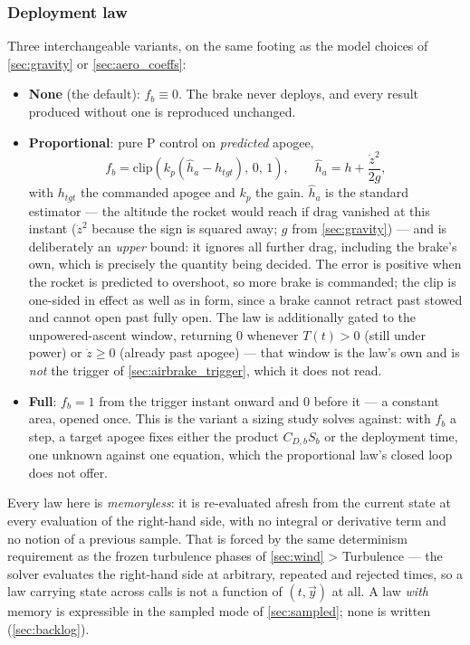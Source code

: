 \subsubsection{Deployment law}\label{sec:airbrake_law}
Three interchangeable variants, on the same footing as the model choices of \autoref{sec:gravity}
or \autoref{sec:aero_coeffs}:
\begin{itemize}
    \item \textbf{None} (the default): $f_b\equiv0$. The brake never deploys, and every result
    produced without one is reproduced unchanged.
    \item \textbf{Proportional}: pure P control on \emph{predicted} apogee,
    \begin{equation} \label{eq:airbrake_p}
        f_b = \mathrm{clip}\!\left(k_p\left(\hat{h}_a-h_{tgt}\right),\,0,\,1\right), \qquad
        \hat{h}_a = h + \frac{\dot{z}^2}{2g},
    \end{equation}
    with $h_{tgt}$ the commanded apogee and $k_p$ the gain. $\hat{h}_a$ is the standard estimator
    --- the altitude the rocket would reach if drag vanished at this instant ($\dot{z}^2$ because
    the sign is squared away; $g$ from \autoref{sec:gravity}) --- and is deliberately an
    \emph{upper} bound: it ignores all further drag, including the brake's own, which is precisely
    the quantity being decided. The error is positive when the rocket is predicted to overshoot, so
    more brake is commanded; the clip is one-sided in effect as well as in form, since a brake
    cannot retract past stowed and cannot open past fully open. The law is additionally gated to
    the unpowered-ascent window, returning $0$ whenever $T(t)>0$ (still under power) or
    $\dot{z}\geq0$ (already past apogee) --- that window is the law's own and is \emph{not} the
    trigger of \autoref{sec:airbrake_trigger}, which it does not read.
    \item \textbf{Full}: $f_b=1$ from the trigger instant onward and $0$ before it --- a constant
    area, opened once. This is the variant a sizing study solves against: with $f_b$ a step, a
    target apogee fixes either the product $C_{D,b}S_b$ or the deployment time, one unknown against
    one equation, which the proportional law's closed loop does not offer.
\end{itemize}
Every law here is \emph{memoryless}: it is re-evaluated afresh from the current state at every
evaluation of the right-hand side, with no integral or derivative term and no notion of a previous
sample. That is forced by the same determinism requirement as the frozen turbulence phases of
\autoref{sec:wind} > Turbulence --- the solver evaluates the right-hand side at arbitrary, repeated
and rejected times, so a law carrying state across calls is not a function of $(t,\vec{y})$ at all.
A law \emph{with} memory is expressible in the sampled mode of \autoref{sec:sampled}; none is
written (\autoref{sec:backlog}).

